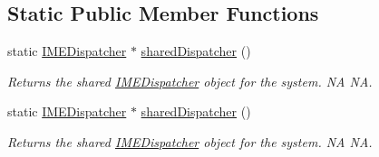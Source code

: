 \subsection*{Static Public Member Functions}
\begin{DoxyCompactItemize}
\item 
\mbox{\label{classIMEDispatcher_a3ef9b8339112fc18e3920e86458bd791}} 
static \hyperlink{classIMEDispatcher}{I\+M\+E\+Dispatcher} $\ast$ \hyperlink{classIMEDispatcher_a3ef9b8339112fc18e3920e86458bd791}{shared\+Dispatcher} ()
\begin{DoxyCompactList}\small\item\em Returns the shared \hyperlink{classIMEDispatcher}{I\+M\+E\+Dispatcher} object for the system.  NA  NA. \end{DoxyCompactList}\item 
\mbox{\label{classIMEDispatcher_a068768a09387dce03f51379b09707298}} 
static \hyperlink{classIMEDispatcher}{I\+M\+E\+Dispatcher} $\ast$ \hyperlink{classIMEDispatcher_a068768a09387dce03f51379b09707298}{shared\+Dispatcher} ()
\begin{DoxyCompactList}\small\item\em Returns the shared \hyperlink{classIMEDispatcher}{I\+M\+E\+Dispatcher} object for the system.  NA  NA. \end{DoxyCompactList}\end{DoxyCompactItemize}

